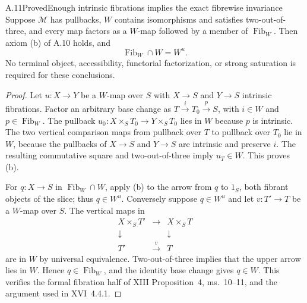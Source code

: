 \begin{claim}{A.11}{Proved}{Enough intrinsic fibrations implies the exact fibrewise invariance}
Suppose $\mathcal M$ has pullbacks, $W$ contains isomorphisms and satisfies two-out-of-three, and every map factors as a $W$-map followed by a member of $\operatorname{Fib}_W$. Then axiom (b) of A.10 holds, and
\[
\operatorname{Fib}_W\cap W=W^u.
\]
No terminal object, accessibility, functorial factorization, or strong saturation is required for these conclusions.
\end{claim}
\begin{proof}
Let $u:X\to Y$ be a $W$-map over $S$ with $X\to S$ and $Y\to S$ intrinsic fibrations. Factor an arbitrary base change as $T\xrightarrow{i}T_0\xrightarrow{p}S$, with $i\in W$ and $p\in\operatorname{Fib}_W$. The pullback $u_0:X\times_S T_0\to Y\times_S T_0$ lies in $W$ because $p$ is intrinsic. The two vertical comparison maps from pullback over $T$ to pullback over $T_0$ lie in $W$, because the pullbacks of $X\to S$ and $Y\to S$ are intrinsic and preserve $i$. The resulting commutative square and two-out-of-three imply $u_T\in W$. This proves (b).

For $q:X\to S$ in $\operatorname{Fib}_W\cap W$, apply (b) to the arrow from $q$ to $1_S$, both fibrant objects of the slice; thus $q\in W^u$. Conversely suppose $q\in W^u$ and let $v:T'\to T$ be a $W$-map over $S$. The vertical maps in
\[
\begin{matrix}
X\times_S T'&\longrightarrow&X\times_S T\\
\downarrow&&\downarrow\\
T'&\xrightarrow{v}&T
\end{matrix}
\]
are in $W$ by universal equivalence. Two-out-of-three implies that the upper arrow lies in $W$. Hence $q\in\operatorname{Fib}_W$, and the identity base change gives $q\in W$. This verifies the formal fibration half of XIII Proposition~4, ms.~10--11, and the argument used in XVI~4.4.1.
\end{proof}

